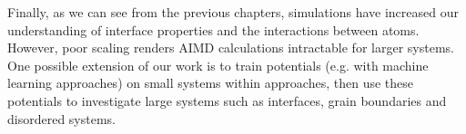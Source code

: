 Finally, as we can see from the previous chapters, \abinitio simulations have increased our understanding of interface properties and the interactions between atoms.
However, poor scaling renders AIMD calculations intractable for larger systems.
One possible extension of our work is to train potentials (e.g. with machine learning approaches\cite{Norvig2010}) on small systems within \abinitio approaches\cite{Behler2007,Behler2011,Behler2014,Kolb2017}, 
then use these potentials to investigate large systems such as interfaces, grain boundaries and disordered systems.




